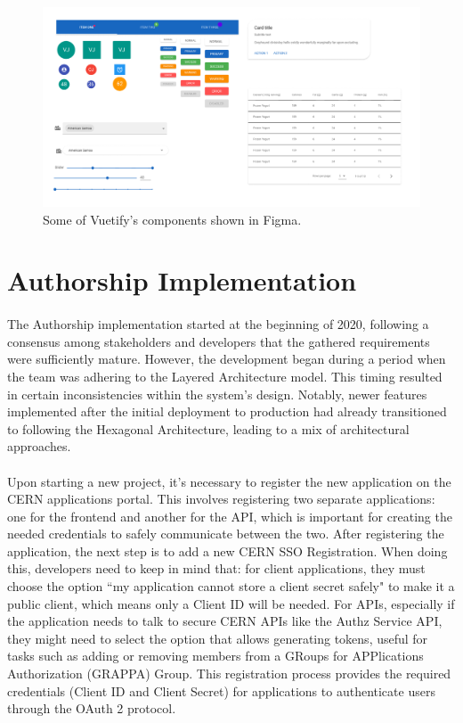 \begin{figure}[H]
    \centering
    \includegraphics[width=1\linewidth]{figuras/vuetify.png}
    \caption{Some of Vuetify's components shown in Figma.}
    \label{fig:vuetify}
\end{figure}

\section{Authorship Implementation} 

\paragraph{} The Authorship implementation started at the beginning of 2020, following a consensus among stakeholders and developers that the gathered requirements were sufficiently mature. However, the development began during a period when the team was adhering to the Layered Architecture model. This timing resulted in certain inconsistencies within the system's design. Notably, newer features implemented after the initial deployment to production had already transitioned to following the Hexagonal Architecture, leading to a mix of architectural approaches.

\paragraph{} Upon starting a new project, it's necessary to register the new application on the CERN applications portal. This involves registering two separate applications: one for the frontend and another for the API, which is important for creating the needed credentials to safely communicate between the two. After registering the application, the next step is to add a new CERN SSO Registration. When doing this, developers need to keep in mind that: for client applications, they must choose the option ``my application cannot store a client secret safely" to make it a public client, which means only a Client ID will be needed. For APIs, especially if the application needs to talk to secure CERN APIs like the Authz Service API, they might need to select the option that allows generating tokens, useful for tasks such as adding or removing members from a GRoups for APPlications Authorization (GRAPPA) Group. This registration process provides the required credentials (Client ID and Client Secret) for applications to authenticate users through the OAuth 2 protocol.

